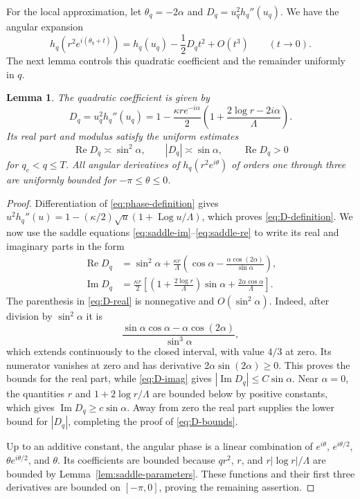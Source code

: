 \documentclass[11pt,reqno]{amsart}
\numberwithin{equation}{section}
\newtheorem{lemma}[theorem]{Lemma}
\DeclareMathOperator{\Log}{Log}
\renewcommand{\Re}{\operatorname{Re}}
\renewcommand{\Im}{\operatorname{Im}}
\begin{document}
For the local approximation, let $\theta_q=-2\alpha$ and
$D_q=u_q^2h_q''(u_q)$. We have the angular expansion
\[
 h_q(r^2e^{i(\theta_q+t)})=h_q(u_q)-\frac12D_qt^2+O(t^3)
 \qquad(t\to0).
\]
The next lemma controls this quadratic coefficient and the remainder
uniformly in $q$.

\begin{lemma}\label{lem:Hessian}
The quadratic coefficient is given by
\begin{equation}\label{eq:D-definition}
 D_q=u_q^2h_q''(u_q)
    =1-\frac{\kappa re^{-i\alpha}}2
                    \left(1+\frac{2\log r-2i\alpha}{\Lambda}\right).
\end{equation}
Its real part and modulus satisfy the uniform estimates
\begin{equation}\label{eq:D-bounds}
 \Re D_q\asymp\sin^2\alpha,
 \qquad |D_q|\asymp\sin\alpha,
 \qquad \Re D_q>0
\end{equation}
for $q_e<q\le T$. All angular derivatives of $h_q(r^2e^{i\theta})$ of orders one
through three are uniformly bounded for $-\pi\le\theta\le0$.
\end{lemma}

\begin{proof}
Differentiation of \eqref{eq:phase-definition} gives
$u^2h_q''(u)=1-(\kappa/2)\sqrt u(1+\Log u/\Lambda)$,
which proves \eqref{eq:D-definition}. We now use the saddle
equations \eqref{eq:saddle-im}--\eqref{eq:saddle-re} to write
its real and imaginary parts in the form
\begin{align}
 \Re D_q&=\sin^2\alpha+
  \frac{\kappa r}{\Lambda}
  \left(\cos\alpha-\frac{\alpha\cos(2\alpha)}{\sin\alpha}\right),
                           \label{eq:D-real}\\
 \Im D_q&=\frac{\kappa r}{2}
  \left[\left(1+\frac{2\log r}{\Lambda}\right)\sin\alpha
                  +\frac{2\alpha\cos\alpha}{\Lambda}\right].
                           \label{eq:D-imag}
\end{align}
The parenthesis in \eqref{eq:D-real} is nonnegative and
$O(\sin^2\alpha)$. Indeed, after division by $\sin^2\alpha$ it is
\[
 \frac{\sin\alpha\cos\alpha-\alpha\cos(2\alpha)}{\sin^3\alpha},
\]
which extends continuously to the closed interval, with value $4/3$
at zero. Its numerator vanishes at zero and has derivative
$2\alpha\sin(2\alpha)\ge0$. This proves the bounds for the real
part, while \eqref{eq:D-imag} gives $|\Im D_q|\le C\sin\alpha$.
Near $\alpha=0$, the quantities $r$
and $1+2\log r/\Lambda$ are bounded below by positive constants,
which gives $\Im D_q\ge c\sin\alpha$. Away from zero the real
part supplies the lower bound for $|D_q|$, completing the proof
of \eqref{eq:D-bounds}.

Up to an additive constant, the angular phase is a linear
combination of $e^{i\theta}$, $e^{i\theta/2}$,
$\theta e^{i\theta/2}$, and $\theta$. Its coefficients are bounded
because $qr^2$, $r$, and $r|\log r|/\Lambda$ are bounded by
Lemma~\ref{lem:saddle-parameters}. These functions and their first
three derivatives are bounded on $[-\pi,0]$, proving the remaining
assertion.
\end{proof}
\end{document}
